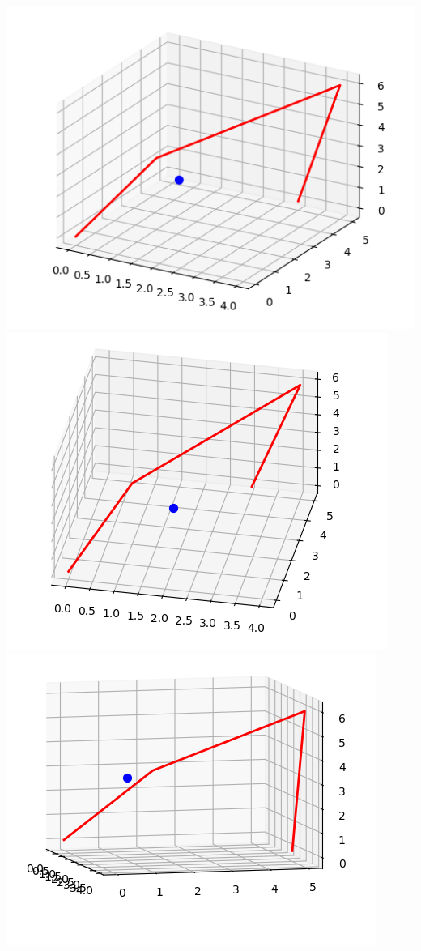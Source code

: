\documentclass[11pt,class=report,crop=false]{standalone}
\begin{document}
\begin{center}
	\includegraphics[scale=\myscale,scale=0.3]{../images3d/ecran-images3d-cours1}
	\includegraphics[scale=\myscale,scale=0.3]{../images3d/ecran-images3d-cours2}
	\includegraphics[scale=\myscale,scale=0.3]{../images3d/ecran-images3d-cours3}	
\end{center}
\end{document}
